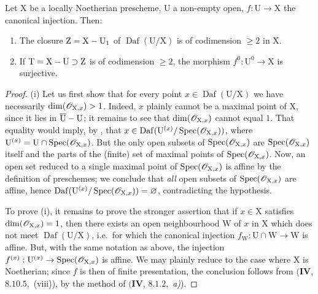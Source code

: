 \begin{theorem}[21.12.6]
\label{IV.21.12.6}
Let $\mathrm{X}$ be a locally Noetherian prescheme, $\mathrm{U}$ a non-empty open, $f:\mathrm{U}\to\mathrm{X}$ the canonical injection.
Then:
\begin{enumerate}[label=\textup{(\roman*)}]
  \item The closure $\mathrm{Z}=\mathrm{X}-\mathrm{U}_1$ of $\operatorname{Daf}(\mathrm{U}/\mathrm{X})$ is of codimension $\geq 2$ in $\mathrm{X}$.
  \item If $\mathrm{T}=\mathrm{X}-\mathrm{U}\supset\mathrm{Z}$ is of codimension $\geq 2$, the morphism $f^0:\mathrm{U}^0\to\mathrm{X}$ is surjective.
\end{enumerate}
\end{theorem}

\begin{proof}
(i) Let us first show that for every point $x\in\operatorname{Daf}(\mathrm{U}/\mathrm{X})$ we have necessarily $\dim(\mathscr{O}_{\mathrm{X},x})>1$.
Indeed, $x$ plainly cannot be a maximal point of $\mathrm{X}$, since it lies in $\overline{\mathrm{U}}-\mathrm{U}$; it remains to see that $\dim(\mathscr{O}_{\mathrm{X},x})$ cannot equal $1$.
That equality would imply, by , that $x\in\operatorname{Daf}(\mathrm{U}^{(x)}/\operatorname{Spec}(\mathscr{O}_{\mathrm{X},x}))$, where $\mathrm{U}^{(x)}=\mathrm{U}\cap\operatorname{Spec}(\mathscr{O}_{\mathrm{X},x})$.
But the only open subsets of $\operatorname{Spec}(\mathscr{O}_{\mathrm{X},x})$ are $\operatorname{Spec}(\mathscr{O}_{\mathrm{X},x})$ itself and the parts of the (finite) set of maximal points of $\operatorname{Spec}(\mathscr{O}_{\mathrm{X},x})$.
Now, an open set reduced to a single maximal point of $\operatorname{Spec}(\mathscr{O}_{\mathrm{X},x})$ is affine by the definition of preschemes; we conclude that \emph{all} open subsets of $\operatorname{Spec}(\mathscr{O}_{\mathrm{X},x})$ are affine, hence $\operatorname{Daf}(\mathrm{U}^{(x)}/\operatorname{Spec}(\mathscr{O}_{\mathrm{X},x}))=\varnothing$, contradicting the hypothesis.

To prove (i), it remains to prove the stronger assertion that if $x\in\mathrm{X}$ satisfies $\dim(\mathscr{O}_{\mathrm{X},x})=1$, then there exists an open neighbourhood $\mathrm{W}$ of $x$ in $\mathrm{X}$ which does not meet $\operatorname{Daf}(\mathrm{U}/\mathrm{X})$, i.e.\ for which the canonical injection $f_{\mathrm{W}}:\mathrm{U}\cap\mathrm{W}\to\mathrm{W}$ is affine.
But, with the same notation as above, the injection $f^{(x)}:\mathrm{U}^{(x)}\to\operatorname{Spec}(\mathscr{O}_{\mathrm{X},x})$ is affine.
We may plainly reduce to the case where $\mathrm{X}$ is Noetherian; since $f$ is then of finite presentation, the conclusion follows from $(\mathbf{IV}$, $8.10.5$,~(viii)), by the method of $(\mathbf{IV}$, $8.1.2$,~\emph{a)}).


\end{proof}
